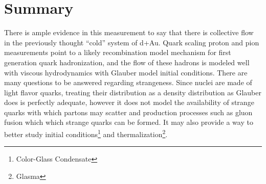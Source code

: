 \section{Summary}
There is ample evidence in this measurement to say that there is collective flow in the previously thought ``cold'' system of d+Au. Quark scaling proton and pion measurements point to a likely recombination model mechanism for first generation quark hadronization, and the flow of these hadrons is modeled well with viscous hydrodynamics with Glauber model initial conditions. There are many questions to be answered regarding strangeness. Since nuclei are made of light flavor quarks, treating their distribution as a density distribution as Glauber does is perfectly adequate, however it does not model the availability of strange quarks with which partons may scatter and production processes such as gluon fusion which which strange quarks can be formed. It may also provide a way to better study initial conditions\footnote{Color-Glass Condensate} and thermalization\footnote{Glasma}. 



\pagebreak
\pagebreak


